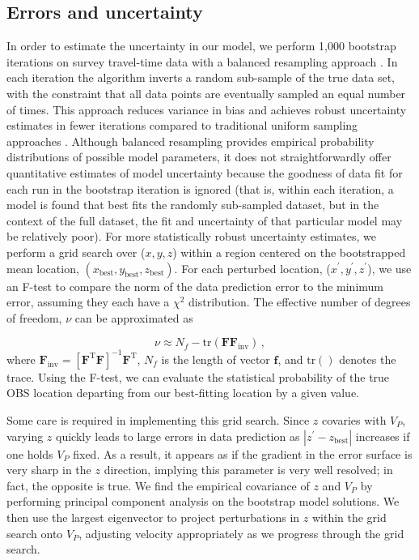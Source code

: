 \documentclass[10pt,titlepage]{article}
\begin{document}
\subsection{Errors and uncertainty}
In order to estimate the uncertainty in our model, we perform 1,000 bootstrap iterations on survey travel-time data with a balanced resampling approach \citep{Davison1986}. In each iteration the algorithm inverts a random sub-sample of the true data set, with the constraint that all data points are eventually sampled an equal number of times. This approach reduces variance in bias and achieves robust uncertainty estimates in fewer iterations compared to traditional uniform sampling approaches \citep{Hung2011}. Although balanced resampling provides empirical probability distributions of possible model parameters, it does not straightforwardly offer quantitative estimates of model uncertainty because the goodness of data fit for each run in the bootstrap iteration is ignored (that is, within each iteration, a model is found that best fits the randomly sub-sampled dataset, but in the context of the full dataset, the fit and uncertainty of that particular model may be relatively poor). For more statistically robust uncertainty estimates, we perform a grid search over ($x,y,z$) within a region centered on the bootstrapped mean location, 
$(x_{{\text{best}}},y_{{\text{best}}},z_{{\text{best}}})$. For each perturbed location, ($x^{\prime},y^{\prime},z^{\prime}$), we use an F-test to compare the norm of the data prediction error to the minimum error, assuming they each have a $\chi^2$ distribution. The effective number of degrees of freedom, $\nu$ can be approximated as 

\begin{equation}
\nu \approx N_f - \text{tr}(\mathbf{F}\mathbf{F}_{\text{inv}}) \,,
\end{equation}
where $\mathbf{F}_{\text{inv}}= \left[ \mathbf{F}^{\text{T}} \mathbf{F} \right]^{-1} \mathbf{F}^{\text{T}}$, $N_f$ is the length of vector $\mathbf{f}$, and $\text{tr}()$ denotes the trace. Using the F-test, we can evaluate the statistical probability of the true OBS location departing from our best-fitting location by a given value. 

Some care is required in implementing this grid search. Since $z$ covaries with $V_P$, varying $z$ quickly leads to large errors in data prediction as $|z^{\prime}-z_{{\text{best}}}|$ increases if one holds $V_P$ fixed. As a result, it appears as if the gradient in the error surface is very sharp in the $z$ direction, implying this parameter is very well resolved; in fact, the opposite is true. We find the empirical covariance of $z$ and $V_P$ by performing principal component analysis on the bootstrap model solutions. We then use the largest eigenvector to project perturbations in $z$ within the grid search onto $V_P$, adjusting velocity appropriately as we progress through the grid search. 
\end{document}
